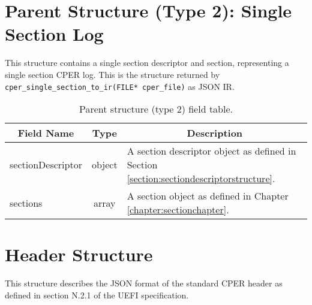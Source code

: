 \documentclass{report}
\newcommand*{\thead}[1]{\multicolumn{1}{|c|}{\bfseries #1}}
\newcommand*{\jsontable}[1]{
    \begin{table}[!ht]
    \label{#1}
    \centering
    \begin{adjustbox}{center}
    \begin{tabular}{|l|c|p{8cm}|}
    \hline
    \thead{Field Name} & \thead{Type} & \thead{Description} \\
    \hline
}
\newcommand*{\jsontableend}[1]{
    \hline
    \end{tabular}
    \end{adjustbox}
    \caption{#1}
    \label{table:#1}
    \end{table}
    \FloatBarrier
}
\begin{document}
\section{Parent Structure (Type 2): Single Section Log}
\label{section:parentstructuretype2}
This structure contains a single section descriptor and section, representing a single section CPER log.
This is the structure returned by \texttt{cper\_single\_section\_to\_ir(FILE* cper\_file)} as JSON IR.

\jsontable{table:parentstructuretype2}
sectionDescriptor & object & A section descriptor object as defined in Section \ref{section:sectiondescriptorstructure}. \\
\hline
sections & array & A section object as defined in Chapter \ref{chapter:sectionchapter}.\\
\jsontableend{Parent structure (type 2) field table.}

\section{Header Structure}
\label{section:headerstructure}
This structure describes the JSON format of the standard CPER header as defined in section N.2.1 of the
UEFI specification.
\end{document}
